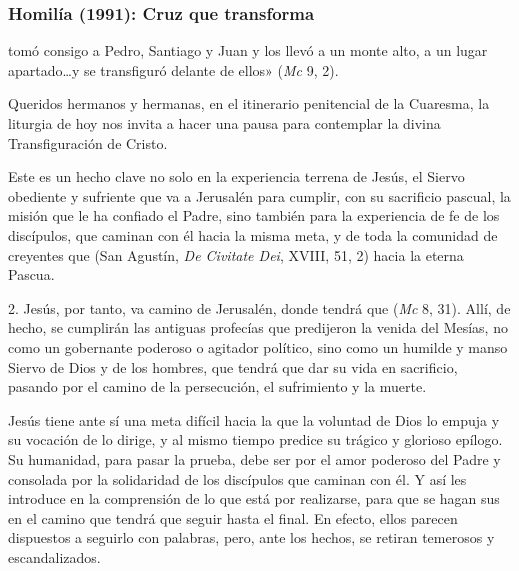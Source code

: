 
\label{b2-03-02-1988H}

\newpage 
\subsubsection{Homilía (1991): Cruz que transforma}


\begin{body}

 tomó consigo a Pedro, Santiago y Juan y los llevó a un monte alto, a un lugar apartado\ldots y se transfiguró delante de ellos» (\textit{Mc} 9, 2).

Queridos hermanos y hermanas, en el itinerario penitencial de la Cuaresma, la liturgia de hoy nos invita a hacer una pausa para contemplar la divina Transfiguración de Cristo.

Este es un hecho clave no solo en la experiencia terrena de Jesús, el Siervo obediente y sufriente que va a Jerusalén para cumplir, con su sacrificio pascual, la misión que le ha confiado el Padre, sino también para la experiencia de fe de los discípulos, que caminan con él hacia la misma meta, y de toda la comunidad de creyentes que  (San Agustín, \textit{De Civitate Dei}, XVIII, 51, 2) hacia la eterna Pascua.

2. Jesús, por tanto, va camino de Jerusalén, donde tendrá que  (\textit{Mc} 8, 31). Allí, de hecho, se cumplirán las antiguas profecías que predijeron la venida del Mesías, no como un gobernante poderoso o agitador político, sino como un humilde y manso Siervo de Dios y de los hombres, que tendrá que dar su vida en sacrificio, pasando por el camino de la persecución, el sufrimiento y la muerte.

Jesús tiene ante sí una meta difícil hacia la que la voluntad de Dios lo empuja y su vocación de  lo dirige, y al mismo tiempo predice su trágico y glorioso epílogo. Su humanidad, para pasar la prueba, debe ser  por el amor poderoso del Padre y consolada por la solidaridad de los discípulos que caminan con él. Y así les introduce en la comprensión de lo que está por realizarse, para que se hagan sus  en el camino que tendrá que seguir hasta el final. En efecto, ellos parecen dispuestos a seguirlo con palabras, pero, ante los hechos, se retiran temerosos y escandalizados.


\end{body}
